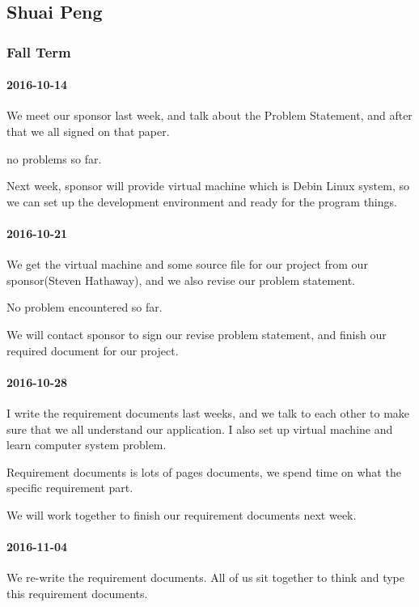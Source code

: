 \subsection{Shuai Peng}

\subsubsection{Fall Term}

\paragraph{2016-10-14}

We meet our sponsor last week, and talk about the Problem Statement, and after that we all signed on that paper.


no problems so far.


Next week, sponsor will provide virtual machine which is Debin Linux system, so we can set up the development environment and ready for the program things.


\paragraph{2016-10-21}
We get the virtual machine and some source file for our project from our sponsor(Steven Hathaway), and we also revise our problem statement.


No problem encountered so far.



We will contact sponsor to sign our revise problem statement, and finish our required document for our project.

\paragraph{2016-10-28}
I write the requirement documents last weeks, and we talk to each other to make sure that we all understand our application. I also set up virtual machine and learn computer system problem.


Requirement documents is lots of pages documents, we spend time on what the specific requirement part.


We will work together to finish our requirement documents next week.

\paragraph{2016-11-04}
We re-write the requirement documents. All of us sit together to think and type this requirement documents.



